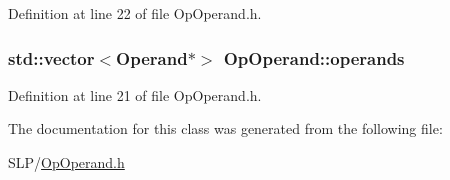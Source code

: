 Definition at line 22 of file Op\+Operand.\+h.

\hypertarget{class_op_operand_a49873cda1ad02191eb14b57a3455f984}{
\subsubsection[{operands}]{\setlength{\rightskip}{0pt plus 5cm}std\+::vector$<${\bf Operand}$\ast$$>$ Op\+Operand\+::operands\hspace{0.3cm}{\ttfamily [protected]}}}\label{class_op_operand_a49873cda1ad02191eb14b57a3455f984}


Definition at line 21 of file Op\+Operand.\+h.



The documentation for this class was generated from the following file\+:\begin{DoxyCompactItemize}
\item 
S\+L\+P/\hyperlink{_op_operand_8h}{Op\+Operand.\+h}\end{DoxyCompactItemize}
